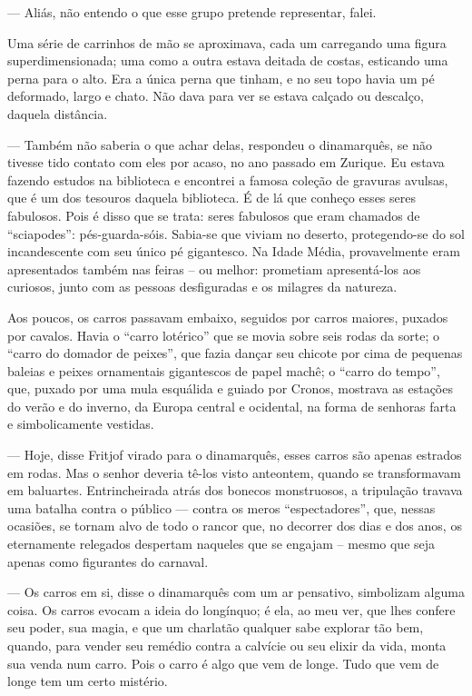 --- Aliás, não entendo o que esse grupo pretende representar, falei.

Uma série de carrinhos de mão se aproximava, cada um carregando uma
figura superdimensionada; uma como a outra estava deitada de costas,
esticando uma perna para o alto. Era a única perna que tinham, e no seu
topo havia um pé deformado, largo e chato. Não dava para ver se estava
calçado ou descalço, daquela distância.

--- Também não saberia o que achar delas, respondeu o dinamarquês, se não
tivesse tido contato com eles por acaso, no ano passado em Zurique. Eu
estava fazendo estudos na biblioteca e encontrei a famosa coleção de
gravuras avulsas, que é um dos tesouros daquela biblioteca. É de lá que
conheço esses seres fabulosos. Pois é disso que se trata: seres
fabulosos que eram chamados de ``sciapodes'': pés-guarda-sóis. Sabia-se
que viviam no deserto, protegendo-se do sol incandescente com seu único
pé gigantesco. Na Idade Média, provavelmente eram apresentados também
nas feiras -- ou melhor: prometiam apresentá-los aos curiosos, junto com
as pessoas desfiguradas e os milagres da natureza.

Aos poucos, os carros passavam embaixo, seguidos por carros maiores,
puxados por cavalos. Havia o ``carro lotérico'' que se movia sobre seis
rodas da sorte; o ``carro do domador de peixes'', que fazia dançar seu
chicote por cima de pequenas baleias e peixes ornamentais gigantescos de
papel machê; o ``carro do tempo'', que, puxado por uma mula esquálida e
guiado por Cronos, mostrava as estações do verão e do inverno, da Europa
central e ocidental, na forma de senhoras farta e simbolicamente
vestidas.

--- Hoje, disse Fritjof virado para o dinamarquês, esses carros são
apenas estrados em rodas. Mas o senhor deveria tê-los visto anteontem,
quando se transformavam em baluartes. Entrincheirada atrás dos
bonecos monstruosos, a tripulação travava uma batalha contra o público
--- contra os meros ``espectadores'', que, nessas ocasiões, se tornam
alvo de todo o rancor que, no decorrer dos dias e dos anos, os
eternamente relegados despertam naqueles que se engajam -- mesmo que
seja apenas como figurantes do carnaval.

--- Os carros em si, disse o dinamarquês com um ar pensativo, simbolizam
alguma coisa. Os carros evocam a ideia do longínquo; é ela, ao meu ver,
que lhes confere seu poder, sua magia, e que um charlatão qualquer sabe
explorar tão bem, quando, para vender seu remédio contra a calvície ou
seu elixir da vida, monta sua venda num carro. Pois o carro é algo que
vem de longe. Tudo que vem de longe tem um certo mistério.

